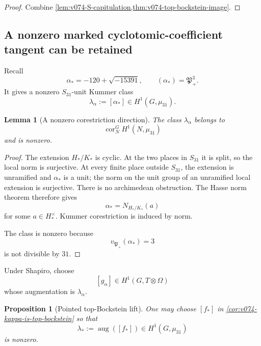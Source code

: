 \documentclass[11pt]{article}
\newtheorem{proposition}[theorem]{Proposition}
\newtheorem{lemma}[theorem]{Lemma}
\theoremstyle{remark}
\begin{document}
\begin{proof}
Combine
\cref{lem:v074-S-capitulation,thm:v074-top-bockstein-image}.
\end{proof}

\subsection{A nonzero marked cyclotomic-coefficient tangent can be retained}

Recall
\[
 \alpha_*=-120+\sqrt{-15391},
 \qquad
 (\alpha_*)=\mathfrak P_+^3.
\]
It gives a nonzero \(S_{31}\)-unit Kummer class
\begin{equation}
 \boxed{
 \lambda_\alpha:=[\alpha_*]
 \in H^1(G,\mu_{31}).}
 \label{eq:v074-lambda-alpha}
\end{equation}

\begin{lemma}[A nonzero corestriction direction]
\label{lem:v074-corestriction-direction}
The class \(\lambda_\alpha\) belongs to
\[
 \operatorname{cor}_{N}^{G}H^1(N,\mu_{31})
\]
and is nonzero.
\end{lemma}

\begin{proof}
The extension \(H_*/K_*\) is cyclic.  At the two places in \(S_{31}\) it
is split, so the local norm is surjective.  At every finite place outside
\(S_{31}\), the extension is unramified and \(\alpha_*\) is a unit; the norm
on the unit group of an unramified local extension is surjective.  There is
no archimedean obstruction.  The Hasse norm theorem therefore gives
\[
 \alpha_*=N_{H_*/K_*}(a)
\]
for some \(a\in H_*^\times\).  Kummer corestriction is induced by norm.

The class is nonzero because
\[
 v_{\mathfrak P_+}(\alpha_*)=3
\]
is not divisible by \(31\).
\end{proof}

Under Shapiro, choose
\[
 [g_\alpha]\in H^1(G,T\otimes\Omega)
\]
whose augmentation is \(\lambda_\alpha\).

\begin{proposition}[Pointed top-Bockstein lift]
\label{prop:v074-pointed-f}
One may choose \([f_*]\) in
\cref{cor:v074-kappa-is-top-bockstein} so that
\begin{equation}
 \boxed{
 \lambda_*:=
 \operatorname{aug}([f_*])
 \in H^1(G,\mu_{31})}
 \label{eq:v074-lambda-star}
\end{equation}
is nonzero.
\end{proposition}
\end{document}
